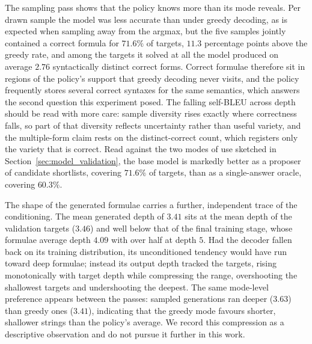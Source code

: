 \documentclass[titlepage,a4paper,11pt]{report}
\begin{document}
    The sampling pass shows that the policy knows more than its mode reveals. Per drawn sample the model was less accurate than under greedy decoding, as is expected when sampling away from the argmax, but the five samples jointly contained a correct formula for $71.6\%$ of targets, $11.3$ percentage points above the greedy rate, and among the targets it solved at all the model produced on average $2.76$ syntactically distinct correct forms. Correct formulae therefore sit in regions of the policy's support that greedy decoding never visits, and the policy frequently stores several correct syntaxes for the same semantics, which answers the second question this experiment posed. The falling self-BLEU across depth should be read with more care: sample diversity rises exactly where correctness falls, so part of that diversity reflects uncertainty rather than useful variety, and the multiple-form claim rests on the distinct-correct count, which registers only the variety that is correct. Read against the two modes of use sketched in Section~\ref{sec:model_validation}, the base model is markedly better as a proposer of candidate shortlists, covering $71.6\%$ of targets, than as a single-answer oracle, covering $60.3\%$.
    
    The shape of the generated formulae carries a further, independent trace of the conditioning. The mean generated depth of $3.41$ sits at the mean depth of the validation targets ($3.46$) and well below that of the final training stage, whose formulae average depth $4.09$ with over half at depth $5$. Had the decoder fallen back on its training distribution, its unconditioned tendency would have run toward deep formulae; instead its output depth tracked the targets, rising monotonically with target depth while compressing the range, overshooting the shallowest targets and undershooting the deepest. The same mode-level preference appears between the passes: sampled generations ran deeper ($3.63$) than greedy ones ($3.41$), indicating that the greedy mode favours shorter, shallower strings than the policy's average. We record this compression as a descriptive observation and do not pursue it further in this work.
    
\end{document}
